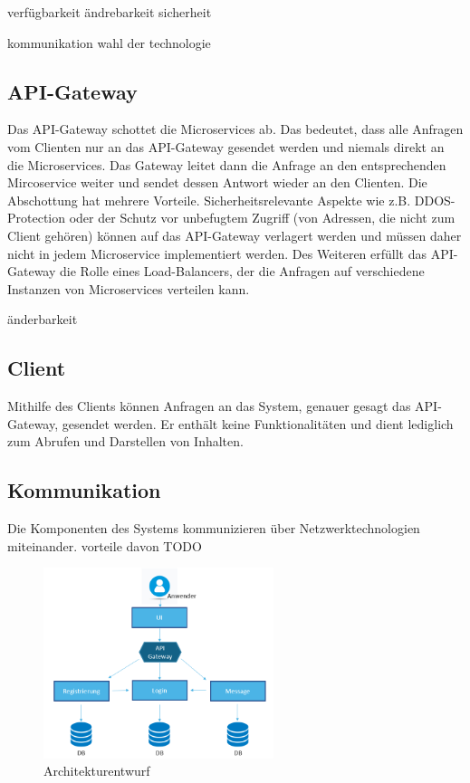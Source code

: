 verfügbarkeit
ändrebarkeit
sicherheit

kommunikation
wahl der technologie

\subsection{API-Gateway}
Das API-Gateway schottet die Microservices ab. Das bedeutet, dass alle Anfragen vom Clienten nur an das API-Gateway gesendet werden und niemals direkt an die Microservices. Das Gateway leitet dann die Anfrage an den entsprechenden Mircoservice weiter und sendet dessen Antwort wieder an den Clienten. Die Abschottung hat mehrere Vorteile. Sicherheitsrelevante Aspekte wie z.B. DDOS-Protection oder der Schutz vor unbefugtem Zugriff (von Adressen, die nicht zum Client gehören) können auf das API-Gateway verlagert werden und müssen daher nicht in jedem Microservice implementiert werden.
Des Weiteren erfüllt das API-Gateway die Rolle eines Load-Balancers, der die Anfragen auf verschiedene Instanzen von Microservices verteilen kann. 

änderbarkeit

\subsection{Client}
Mithilfe des Clients können Anfragen an das System, genauer gesagt das API-Gateway, gesendet werden. Er enthält keine Funktionalitäten und dient lediglich zum Abrufen und Darstellen von Inhalten.


\subsection{Kommunikation}
Die Komponenten des Systems kommunizieren über Netzwerktechnologien miteinander. vorteile davon TODO

\begin{figure}[bth] 
	\centering
	\includegraphics[width=0.6\textwidth]{Graphics/Architekturentwurf.png}
	\caption{Architekturentwurf}
\end{figure}

